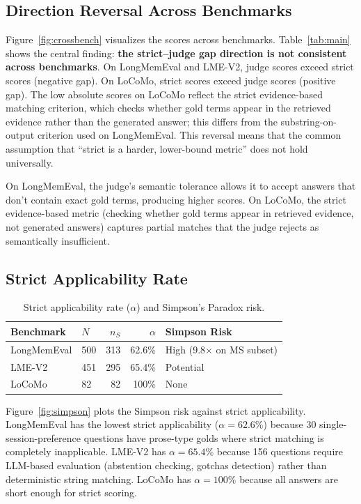 \documentclass[10pt]{article}
\begin{document}
\subsection{Direction Reversal Across Benchmarks}
Figure~\ref{fig:crossbench} visualizes the scores across benchmarks. Table~\ref{tab:main} shows the central finding: \textbf{the strict--judge gap direction is not consistent across benchmarks}. On LongMemEval and LME-V2, judge scores exceed strict scores (negative gap). On LoCoMo, strict scores exceed judge scores (positive gap). The low absolute scores on LoCoMo reflect the strict evidence-based matching criterion, which checks whether gold terms appear in the retrieved evidence rather than the generated answer; this differs from the substring-on-output criterion used on LongMemEval. This reversal means that the common assumption that ``strict is a harder, lower-bound metric'' does not hold universally.

On LongMemEval, the judge's semantic tolerance allows it to accept answers that don't contain exact gold terms, producing higher scores. On LoCoMo, the strict evidence-based metric (checking whether gold terms appear in retrieved evidence, not generated answers) captures partial matches that the judge rejects as semantically insufficient.

\subsection{Strict Applicability Rate}
\begin{table}[h]
\centering
\caption{Strict applicability rate ($\alpha$) and Simpson's Paradox risk.}
\label{tab:alpha}
\begin{tabular}{llrrl}
\toprule
Benchmark & $N$ & $n_S$ & $\alpha$ & Simpson Risk \\
\midrule
LongMemEval & 500 & 313 & 62.6\% & High (9.8$\times$ on MS subset) \\
LME-V2 & 451 & 295 & 65.4\% & Potential \\
LoCoMo & 82 & 82 & 100\% & None \\
\bottomrule
\end{tabular}
\end{table}

Figure~\ref{fig:simpson} plots the Simpson risk against strict applicability. LongMemEval has the lowest strict applicability ($\alpha = 62.6\%$) because 30 single-session-preference questions have prose-type golds where strict matching is completely inapplicable. LME-V2 has $\alpha = 65.4\%$ because 156 questions require LLM-based evaluation (abstention checking, gotchas detection) rather than deterministic string matching. LoCoMo has $\alpha = 100\%$ because all answers are short enough for strict scoring.
\end{document}
